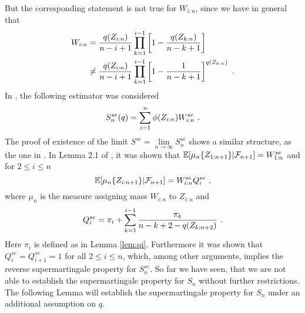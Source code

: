 %
But the corresponding statement is not true for $W_{i:n}$, since we have in general that
\begin{align*}
W_{i:n} &= \frac{q(Z_{i:n})}{n-i+1}\prod\limits_{k=1}^{i-1}\left[1-\frac{q(Z_{k:n})}{n-k+1}\right] \\
&\neq \frac{q(Z_{i:n})}{n-i+1}\prod\limits_{k=1}^{i-1}\left[1-\frac{1}{n-k+1}\right]^{q(Z_{k:n})}\textrm{ .}
\end{align*}
%
In \cite{dikta2000strong}, the following estimator was considered
$$S_n^{se}(q) = \sum_{i=1}^n \phi(Z_{i:n}) W_{i:n}^{se}\textrm{ .}$$
The proof of existence of the limit $S^{se} = \lim\limits_{n\to\infty} S_n^{se}$ shows a similar structure, as the one in \cite{bose1999strong}. In Lemma 2.1 of \cite{dikta2000strong}, it was shown that $\mathbb{E}[\mu_n\{Z_{1:n+1}\} | \mathcal{F}_{n+1}] = W_{1:n}^{se}$ and for $2\leq i\leq n$
$$\mathbb{E}[\mu_n\{Z_{i:n+1}\} | \mathcal{F}_{n+1}] = W_{i:n}^{se}Q_i^{se}\textrm{ ,}$$
where $\mu_n$ is the measure assigning mass $W_{i:n}$ to  $Z_{i:n}$ and
$$Q_i^{se} = \pi_i + \sum_{k=1}^{i-1} \frac{\pi_k}{n-k+2-q(Z_{k:n+2})}\textrm{ .}$$
Here $\pi_i$ is defined as in Lemma \ref{lem:qi}. Furthermore it was shown that $Q_i^{se} = Q_{i+1}^{se} = 1$ for all $2\leq i\leq n$, which, among other arguments, implies the reverse supermartingale property for $S_n^{se}$.
%
So far we have seen, that we are not able to establish the supermartingale property for $S_n$ without further restrictions. The following Lemma will establish the supermartingale property for $S_n$ under an additional assumption on $q$. 
